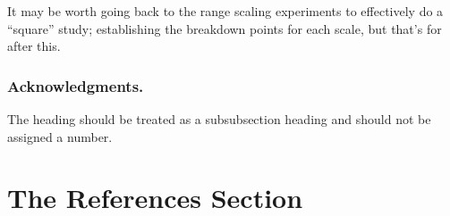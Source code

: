 \documentclass[runningheads,a4paper]{llncs}
\begin{document}
It may be worth going back to the range scaling experiments to effectively do a ``square'' study; establishing the breakdown points for each scale, but that's for after this.


\subsubsection*{Acknowledgments.} The heading should be treated as a
subsubsection heading and should not be assigned a number.

\section{The References Section}\label{references}



% 
% 
% 
% 
% 
% 
% 
% 
\end{document}
